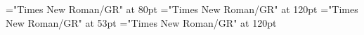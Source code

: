 \documentclass[a4paper]{article}
\begin{document}
\pagestyle{plain}
\sloppy
\setlength{\parfillskip}{0pt plus 1fil}
\font\pa="Times New Roman/GR" at 80pt
\font\childapa="Times New Roman/GR" at 120pt
\font\childbpa="Times New Roman/GR" at 53pt
\font\childaenpa="Times New Roman/GR" at 120pt

\mbox{} 
\newpage 
\newpage 
\setcounter{page}{1} 
\pagestyle{fancy} 


\end{document}
